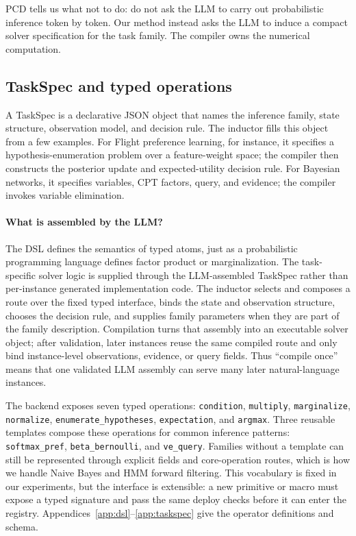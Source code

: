 \documentclass{article}
\newcommand{\taskspec}{TaskSpec}
\begin{document}
PCD tells us what not to do: do not ask the LLM to carry out probabilistic inference token by token.
Our method instead asks the LLM to induce a compact solver specification for the task family.
The compiler owns the numerical computation.

\subsection{TaskSpec and typed operations}

A \taskspec{} is a declarative JSON object that names the inference family, state structure, observation model, and decision rule.
The inductor fills this object from a few examples.
For Flight preference learning, for instance, it specifies a hypothesis-enumeration problem over a feature-weight space; the compiler then constructs the posterior update and expected-utility decision rule.
For Bayesian networks, it specifies variables, CPT factors, query, and evidence; the compiler invokes variable elimination.

\paragraph{What is assembled by the LLM?}
The DSL defines the semantics of typed atoms, just as a probabilistic programming language defines factor product or marginalization.
The task-specific solver logic is supplied through the LLM-assembled \taskspec{} rather than per-instance generated implementation code.
The inductor selects and composes a route over the fixed typed interface, binds the state and observation structure, chooses the decision rule, and supplies family parameters when they are part of the family description.
Compilation turns that assembly into an executable solver object; after validation, later instances reuse the same compiled route and only bind instance-level observations, evidence, or query fields.
Thus ``compile once'' means that one validated LLM assembly can serve many later natural-language instances.

The backend exposes seven typed operations:
\texttt{condition}, \texttt{multiply}, \texttt{marginalize}, \texttt{normalize}, \texttt{enumerate\_hypotheses}, \texttt{expectation}, and \texttt{argmax}.
Three reusable templates compose these operations for common inference patterns: \texttt{softmax\_pref}, \texttt{beta\_bernoulli}, and \texttt{ve\_query}.
Families without a template can still be represented through explicit fields and core-operation routes, which is how we handle Naive Bayes and HMM forward filtering.
This vocabulary is fixed in our experiments, but the interface is extensible: a new primitive or macro must expose a typed signature and pass the same deploy checks before it can enter the registry.
Appendices~\ref{app:dsl}--\ref{app:taskspec} give the operator definitions and schema.
\end{document}

